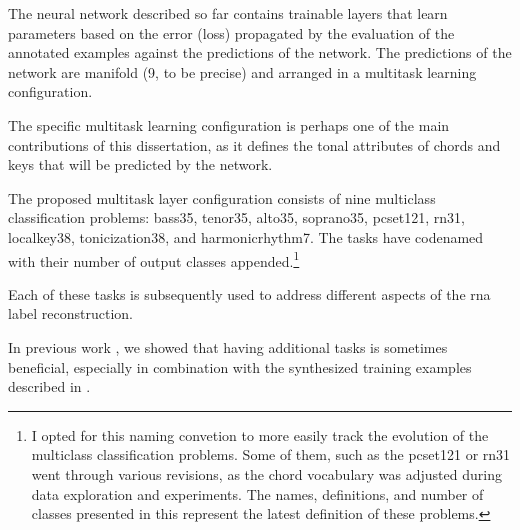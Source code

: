 
The neural network described so far contains trainable
layers that learn parameters based on the error (loss)
propagated by the evaluation of the annotated examples
against the predictions of the network. The predictions of
the network are manifold (9, to be precise) and arranged in
a multitask learning configuration.

The specific multitask learning configuration is perhaps one
of the main contributions of this dissertation, as it
defines the tonal attributes of chords and keys that will be
predicted by the network.

The proposed multitask layer configuration consists of nine
multiclass classification problems: \gls{bass35},
\gls{tenor35}, \gls{alto35}, \gls{soprano35},
\gls{pcset121}, \gls{rn31}, \gls{localkey38},
\gls{tonicization38}, and \gls{harmonicrhythm7}. The tasks
have codenamed with their number of output classes
appended.\footnote{I opted for this naming convetion to more
easily track the evolution of the multiclass classification
problems. Some of them, such as the \gls{pcset121} or
\gls{rn31} went through various revisions, as the chord
vocabulary was adjusted during data exploration and
experiments. The names, definitions, and number of classes
presented in this \thesisdiss{} represent the latest
definition of these problems.}

Each of these tasks is subsequently used to address
different aspects of the \gls{rna} label reconstruction.


 In previous work \parencite{napoleslopez2021augmentednet},
we showed that having additional tasks is sometimes
beneficial, especially in combination with the synthesized
training examples described in
.
